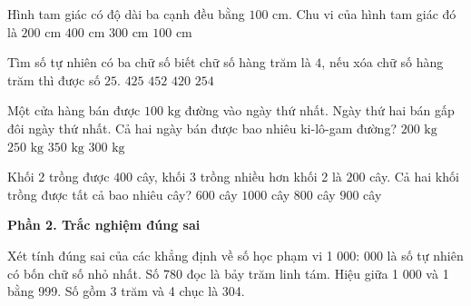 \begin{ex} %
Hình tam giác có độ dài ba cạnh đều bằng $100\text{ cm}$. Chu vi của hình tam giác đó là
\choice
{$200\text{ cm}$}
{$400\text{ cm}$}
{\True $300\text{ cm}$}
{$100\text{ cm}$}
\end{ex}

\begin{ex} %
Tìm số tự nhiên có ba chữ số biết chữ số hàng trăm là $4$, nếu xóa chữ số hàng trăm thì được số $25$.
\choice
{\True $425$}
{$452$}
{$420$}
{$254$}
\end{ex}

\begin{ex} %
Một cửa hàng bán được $100\text{ kg}$ đường vào ngày thứ nhất. Ngày thứ hai bán gấp đôi ngày thứ nhất. Cả hai ngày bán được bao nhiêu ki-lô-gam đường?
\choice
{$200\text{ kg}$}
{$250\text{ kg}$}
{$350\text{ kg}$}
{\True $300\text{ kg}$}
\end{ex}

\begin{ex} %
Khối 2 trồng được $400$ cây, khối 3 trồng nhiều hơn khối 2 là $200$ cây. Cả hai khối trồng được tất cả bao nhiêu cây?
\choice
{$600$ cây}
{\True $1 000$ cây}
{$800$ cây}
{$900$ cây}
\end{ex}

\textbf{Phần 2. Trắc nghiệm đúng sai}

\begin{ex} %
Xét tính đúng sai của các khẳng định về số học phạm vi 1 000:
\choiceTF
{ 000 là số tự nhiên có bốn chữ số nhỏ nhất.}
{Số 780 đọc là bảy trăm linh tám.}
{\True Hiệu giữa 1 000 và 1 bằng 999.}
{Số gồm 3 trăm và 4 chục là 304.}
\end{ex}

